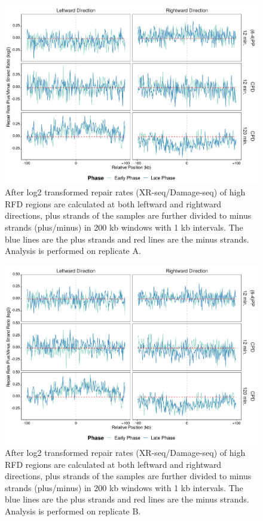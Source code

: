 \begin{figure}[H]
\begin{center}
\includegraphics[width=\textwidth]{Chapters/7_appendix/figures/supfig76}
\caption[Repair rate plus/minus ratio of high RFDs in 200 kb (replicate A).]{After log2 transformed repair rates (XR-seq/Damage-seq) of high RFD regions are calculated at both leftward and rightward directions, plus strands of the samples are further divided to minus strands (plus/minus) in 200 kb windows with 1 kb intervals. The blue lines are the plus strands and red lines are the minus strands. Analysis is performed on replicate A.}
\label{supfig:rrpm200rfdA}
\end{center}
\end{figure}

\begin{figure}[H]
\begin{center}
\includegraphics[width=\textwidth]{Chapters/7_appendix/figures/supfig77}
\caption[Repair rate plus/minus ratio of high RFDs in 200 kb (replicate B).]{After log2 transformed repair rates (XR-seq/Damage-seq) of high RFD regions are calculated at both leftward and rightward directions, plus strands of the samples are further divided to minus strands (plus/minus) in 200 kb windows with 1 kb intervals. The blue lines are the plus strands and red lines are the minus strands. Analysis is performed on replicate B.}
\label{supfig:rrpm200rfdB}
\end{center}
\end{figure}

